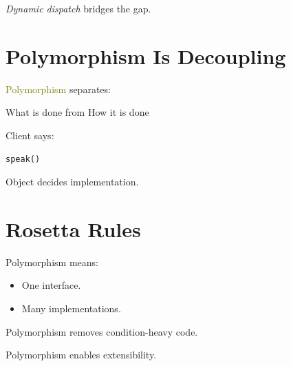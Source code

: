 \documentclass[11pt,a4paper]{book}
\begin{document}

\emph{Dynamic dispatch} bridges the gap.


\section{Polymorphism Is Decoupling}

\begin{idea}

\textcolor{olive}{Polymorphism} separates:

What is done from
How it is done

\end{idea}

\newpage
Client says:

\begin{verbatim}
speak()
\end{verbatim}


Object decides implementation.


\section{Rosetta Rules}

\begin{rosettarule}

Polymorphism means:
\begin{itemize}
\item One interface.
\item Many implementations.
\end{itemize}

\end{rosettarule}

\begin{rosettarule}

Polymorphism removes condition-heavy code.

\end{rosettarule}

\begin{rosettarule}

Polymorphism enables extensibility.

\end{rosettarule}
\end{document}

